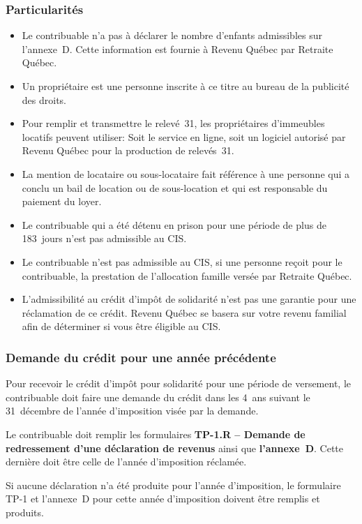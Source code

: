 \subsubsection{Particularités}
\begin{itemize}
	\item Le contribuable n'a pas à déclarer le nombre d'enfants admissibles sur l'annexe~D. Cette information est fournie à Revenu Québec par Retraite Québec.
	\item Un \og propriétaire \fg{} est une personne inscrite à ce titre au bureau de la publicité des droits. 
	\item Pour remplir et transmettre le relevé~31, les propriétaires d'immeubles locatifs peuvent utiliser: Soit le service en ligne, soit un logiciel autorisé par Revenu Québec pour la production de relevés~31.
	\item La mention de \og locataire ou sous-locataire \fg{} fait référence à une personne qui a conclu un bail de location ou de sous-location et qui est responsable du paiement du loyer.
	\item Le contribuable qui a été détenu en prison pour une période de plus de 183~jours n'est pas admissible au CIS.
	\item Le contribuable n'est pas admissible au CIS, si une personne reçoit pour le contribuable, la prestation de l'allocation famille versée par Retraite Québec.
	\item L'admissibilité au crédit d'impôt de solidarité n'est pas une garantie pour une réclamation de ce crédit. Revenu Québec se basera sur votre revenu familial afin de déterminer si vous être éligible au CIS.
\end{itemize}

\subsubsection{Demande du crédit pour une année précédente}
Pour recevoir le crédit d'impôt pour solidarité pour une période de versement, le contribuable doit faire une demande du crédit dans les 4~ans suivant le 31~décembre de l'année d'imposition visée par la demande.

Le contribuable doit remplir les formulaires \textbf{TP-1.R -- Demande de redressement d'une déclaration de revenus} ainsi que \textbf{l'annexe~D}. Cette dernière doit être celle de l'année d'imposition réclamée.

Si aucune déclaration n'a été produite pour l'année d'imposition, le formulaire TP-1 et l'annexe~D pour cette année d'imposition doivent être remplis et produits.

